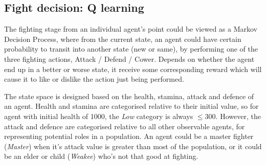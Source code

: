\subsection{Fight decision: Q learning}
The fighting stage from an individual agent's point could be viewed as a Markov Decision Process, where from the current state, an agent could have certain probability to transit into another state (new or same), by performing one of the three fighting actions, Attack / Defend / Cower. Depends on whether the agent end up in a better or worse state, it receive some corresponding reward which will cause it to like or dislike the action just being performed.

The state space is designed based on the health, stamina, attack and defence of an agent. Health and stamina are categorised relative to their initial value, so for agent with initial health of 1000, the \textit{Low} category is always $\leq 300$. However, the attack and defence are categorised relative to all other observable agents, for representing potential roles in a population. An agent could be a master fighter (\textit{Master}) when it's attack value is greater than most of the population, or it could be an elder or child (\textit{Weakee}) who's not that good at fighting.

